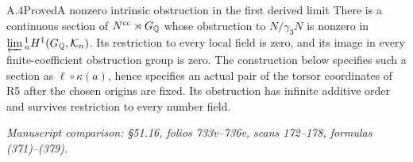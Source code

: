 \begin{statement}{A.4}{Proved}{A nonzero intrinsic obstruction in the first derived limit}
There is a continuous section of $N^{\rm cc}\rtimes G_{\mathbb Q}$
whose obstruction to $N/\gamma_3N$ is nonzero in
$\varprojlim{}^1_nH^1(G_{\mathbb Q},\mathcal K_n)$.
Its restriction to every local field is zero, and its image in every
finite-coefficient obstruction group is zero. The construction
below specifies such a section as $\ell\circ\kappa(a)$, hence
specifies an actual pair of the torsor coordinates of R5 after the
chosen origins are fixed. Its obstruction has infinite additive
order and survives restriction to every number field.
\par\smallskip\noindent\emph{Manuscript comparison: \S51.16,
folios 733v--736v, scans 172--178, formulas (371)--(379).}
\end{statement}
